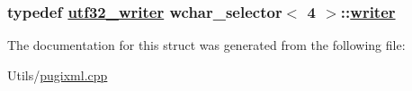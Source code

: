 \hypertarget{structwchar__selector_3_014_01_4_48042e7fe51c4661397ae7afe3905243}{
\subsubsection[writer]{\setlength{\rightskip}{0pt plus 5cm}typedef \hyperlink{structutf32__writer}{utf32\_\-writer} wchar\_\-selector$<$ 4 $>$::\hyperlink{structutf32__writer}{writer}}}
\label{structwchar__selector_3_014_01_4_48042e7fe51c4661397ae7afe3905243}




The documentation for this struct was generated from the following file:\begin{CompactItemize}
\item 
Utils/\hyperlink{pugixml_8cpp}{pugixml.cpp}\end{CompactItemize}
